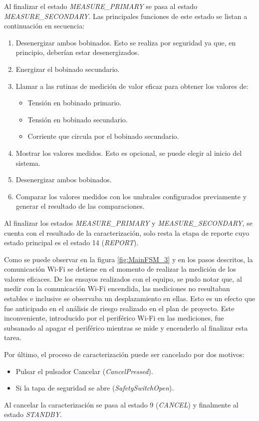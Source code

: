 Al finalizar el estado \textit{MEASURE\_PRIMARY} se pasa al estado \textit{MEASURE\_SECONDARY}. Las principales funciones de este estado se listan a continuación en secuencia:

\begin{enumerate}
\item Desenergizar ambos bobinados. Esto se realiza por seguridad ya que, en principio, deberían estar desenergizados.
\item Energizar el bobinado secundario.
\item Llamar a las rutinas de medición de valor eficaz para obtener los valores de:
\begin{itemize}
 	\item Tensión en bobinado primario.
	\item Tensión en bobinado secundario.
	\item Corriente que circula por el bobinado secundario.	
\end{itemize}
\item Mostrar los valores medidos. Esto es opcional, se puede elegir al inicio del sistema.
\item Desenergizar ambos bobinados.
\item Comparar los valores medidos con los umbrales configurados previamente y generar el resultado de las comparaciones.
\end{enumerate}

Al finalizar los estados \textit{MEASURE\_PRIMARY} y \textit{MEASURE\_SECONDARY}, se cuenta con el resultado de la caracterización, solo resta la etapa de reporte cuyo estado principal es el estado 14 (\textit{REPORT}). 

Como se puede observar en la figura \ref{fig:MainFSM_3} y en los pasos descritos, la comunicación Wi-Fi se detiene en el momento de realizar la medición de los valores eficaces. De los ensayos realizados con el equipo, se pudo notar que, al medir con la comunicación Wi-Fi encendida, las mediciones no resultaban estables e inclusive se observaba un desplazamiento en ellas. Esto es un efecto que fue anticipado en el análisis de riesgo realizado en el plan de proyecto. Este inconveniente, introducido por el periférico Wi-Fi en las mediciones, fue subsanado al apagar el periférico mientras se mide y encenderlo al finalizar esta tarea.

Por último, el proceso de caracterización puede ser cancelado por dos motivos: 
\begin{itemize}
 	\item Pulsar el pulsador Cancelar (\textit{CancelPressed}).
	\item Si la tapa de seguridad se abre (\textit{SafetySwitchOpen}).	
\end{itemize}
Al cancelar la caracterización se pasa al estado 9 (\textit{CANCEL}) y finalmente al estado \textit{STANDBY}.


